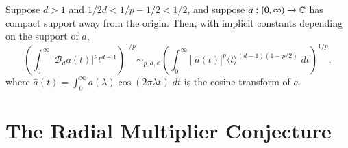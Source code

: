 \begin{theorem} \label{GarrigosSeegerTheorem}
    Suppose $d > 1$ and $1/2d < 1/p - 1/2 < 1/2$, and suppose $a: [0,\infty) \to \operatorname{\mathbb{C}}$ has compact support away from the origin. Then, with implicit constants depending on the support of $a$,
    \[ \left( \int_0^\infty |\mathcal{B}_d a (t)|^p t^{d-1} \right)^{1/p} \sim_{p,d,\phi} \left( \int_0^\infty |\;\!\widehat{a}(t)|^p \langle t \rangle^{(d-1)(1 - p/2)}\; dt \right)^{1/p}, \]
    where $\widehat{a}(t) = \int_0^\infty a(\lambda) \cos(2 \pi \lambda t)\; dt$ is the cosine transform of $a$.
\end{theorem}

%
%
%
%

\section{The Radial Multiplier Conjecture}

